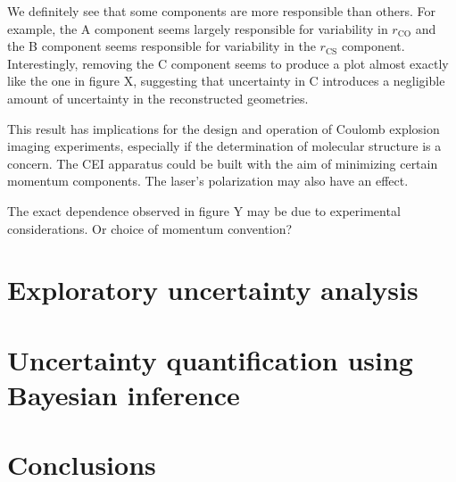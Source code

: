 We definitely see that some components are more responsible than others. For example, the A component seems largely responsible for variability in $r_\mathrm{CO}$ and the B component seems responsible for variability in the $r_\mathrm{CS}$ component. Interestingly, removing the C component seems to produce a plot almost exactly like the one in figure X, suggesting that uncertainty in C introduces a negligible amount of uncertainty in the reconstructed geometries.

This result has implications for the design and operation of Coulomb explosion imaging experiments, especially if the determination of molecular structure is a concern. The CEI apparatus could be built with the aim of minimizing certain momentum components. The laser's polarization may also have an effect.

The exact dependence observed in figure Y may be due to experimental considerations. Or choice of momentum convention?

\section{Exploratory uncertainty analysis} \label{sec:uncertaintyAnalysis}

\section{Uncertainty quantification using Bayesian inference} \label{sec:uncertaintyBayesian}

\section{Conclusions}